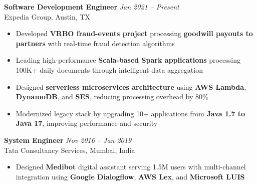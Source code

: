 \documentclass[a4paper,10pt]{article}
\begin{document}
\noindent \textbf{Software Development Engineer} \hfill \textit{Jan 2021 -- Present} \\
Expedia Group, Austin, TX
\begin{itemize}[left=0pt, label=\textbullet]
    \item Developed \textbf{VRBO fraud-events project} processing \textbf{goodwill payouts to partners} with real-time fraud detection algorithms
    \item Leading high-performance \textbf{Scala-based Spark applications} processing 100K+ daily documents through intelligent data aggregation
    \item Designed \textbf{serverless microservices architecture} using \textbf{AWS Lambda}, \textbf{DynamoDB}, and \textbf{SES}, reducing processing overhead by 80\%
    \item Modernized legacy stack by upgrading 10+ applications from \textbf{Java 1.7 to Java 17}, improving performance and security
\end{itemize}

\vspace{0.1cm}

\noindent \textbf{System Engineer} \hfill \textit{Nov 2016 -- Jan 2019} \\
Tata Consultancy Services, Mumbai, India
\begin{itemize}[left=0pt, label=\textbullet]
    \item Designed \textbf{Medibot} digital assistant serving 1.5M users with multi-channel integration using \textbf{Google Dialogflow}, \textbf{AWS Lex}, and \textbf{Microsoft LUIS}
\end{itemize}

\vspace{0.1cm}


\end{document}
